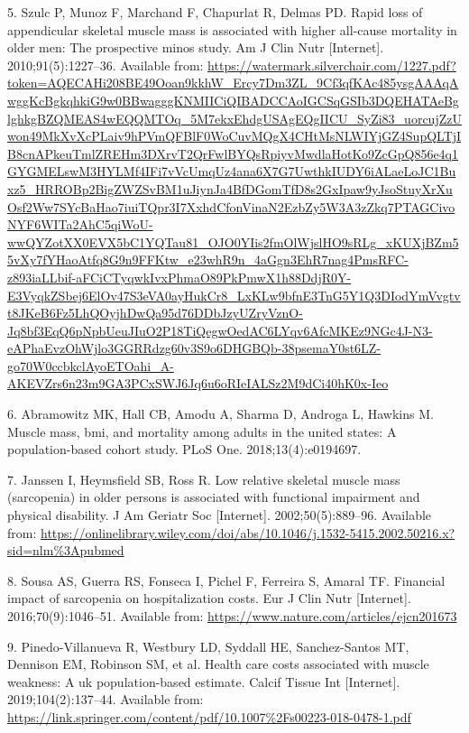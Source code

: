 \documentclass[twoside,10pt]{gihclass} %
\begin{document}
\leavevmode\hypertarget{ref-RN2515}{}%
5. Szulc P, Munoz F, Marchand F, Chapurlat R, Delmas PD. Rapid loss of appendicular skeletal muscle mass is associated with higher all-cause mortality in older men: The prospective minos study. Am J Clin Nutr {[}Internet{]}. 2010;91(5):1227--36. Available from: \url{https://watermark.silverchair.com/1227.pdf?token=AQECAHi208BE49Ooan9kkhW_Ercy7Dm3ZL_9Cf3qfKAc485ysgAAAqAwggKcBgkqhkiG9w0BBwagggKNMIICiQIBADCCAoIGCSqGSIb3DQEHATAeBglghkgBZQMEAS4wEQQMTOq_5M7ekxEhdgUSAgEQgIICU_SyZi83_uorcujZzUwon49MkXvXcPLaiv9hPVmQFBlF0WoCuvMQgX4CHtMsNLWIYjGZ4SupQLTjIB8cnAPkeuTmlZREHm3DXrvT2QrFwlBYQsRpiyvMwdlaHotKo9ZcGpQ856e4q1GYGMELswM3HYLMf4IFi7vVcUmqUz4ana6X7G7UwthkIUDY6iALaeLoJC1Buxz5_HRROBp2BigZWZSvBM1uJiynJa4BfDGomTfD8s2GxIpaw9yJsoStuyXrXuOsf2Ww7SYcBaHao7iuiTQpr3I7XxhdCfonVinaN2EzbZy5W3A3zZkq7PTAGCivoNYF6WITa2AhC5qiWoU-wwQYZotXX0EVX5bC1YQTau81_OJO0YIis2fmOlWjslHO9sRLg_xKUXjBZm55vXy7fYHaoAtfq8G9n9FFKtw_e23whR9n_4aGgn3EhR7nag4PmsRFC-z893iaLLbif-aFCiCTyqwkIvxPhmaO89PkPmwX1h88DdjR0Y-E3VyqkZSbej6ElOv47S3eVA0ayHukCr8_LxKLw9bfnE3TnG5Y1Q3DIodYmVvgtvt8JKeB6Fz5LhQOyjhDwQa95d76DDbJzyUZryVznO-Jq8bf3EqQ6pNpbUeuJIuO2P18TiQegwOedAC6LYqv6AfcMKEz9NGc4J-N3-eAPhaEvzOhWjlo3GGRRdzg60v3S9o6DHGBQb-38psemaY0st6LZ-go70W0ccbkclAyoETOahi_A-AKEVZrs6n23m9GA3PCxSWJ6Jq6u6oRIeIALSz2M9dCi40hK0x-Ieo}

\leavevmode\hypertarget{ref-RN2516}{}%
6. Abramowitz MK, Hall CB, Amodu A, Sharma D, Androga L, Hawkins M. Muscle mass, bmi, and mortality among adults in the united states: A population-based cohort study. PLoS One. 2018;13(4):e0194697.

\leavevmode\hypertarget{ref-RN2517}{}%
7. Janssen I, Heymsfield SB, Ross R. Low relative skeletal muscle mass (sarcopenia) in older persons is associated with functional impairment and physical disability. J Am Geriatr Soc {[}Internet{]}. 2002;50(5):889--96. Available from: \url{https://onlinelibrary.wiley.com/doi/abs/10.1046/j.1532-5415.2002.50216.x?sid=nlm\%3Apubmed}

\leavevmode\hypertarget{ref-RN2532}{}%
8. Sousa AS, Guerra RS, Fonseca I, Pichel F, Ferreira S, Amaral TF. Financial impact of sarcopenia on hospitalization costs. Eur J Clin Nutr {[}Internet{]}. 2016;70(9):1046--51. Available from: \url{https://www.nature.com/articles/ejcn201673}

\leavevmode\hypertarget{ref-RN2184}{}%
9. Pinedo-Villanueva R, Westbury LD, Syddall HE, Sanchez-Santos MT, Dennison EM, Robinson SM, et al. Health care costs associated with muscle weakness: A uk population-based estimate. Calcif Tissue Int {[}Internet{]}. 2019;104(2):137--44. Available from: \url{https://link.springer.com/content/pdf/10.1007\%2Fs00223-018-0478-1.pdf}
\end{document}
